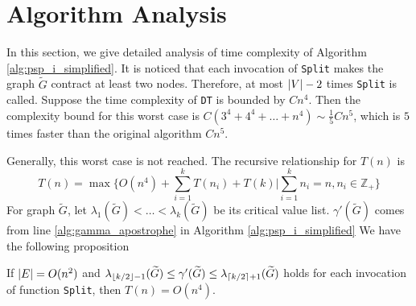 \documentclass[runningheads]{llncs}
\begin{document}
\section{Algorithm Analysis}
In this section, we give detailed analysis of time complexity of Algorithm \ref{alg:psp_i_simplified}.
It is noticed that each invocation of \texttt{Split} makes the graph $\widetilde{G}$ contract at least two nodes. Therefore, at most $\lvert V\rvert-2$ times \texttt{Split} is called. Suppose the time complexity of \texttt{DT} is bounded by $Cn^4$. Then the complexity bound for this worst case is $C(3^4+4^4 + \dots + n^4) \sim \frac{1}{5}Cn^5$, which is $5$ times faster than the original algorithm $Cn^5$.

Generally, this worst case is not reached. The recursive relationship for $T(n)$ is
\begin{equation}\label{eq:Tn}
T(n) = \max \{ O(n^4) + \sum_{i=1}^k T(n_i) + T(k) | \sum_{i=1}^k n_i = n, n_i \in \mathbb{Z}_{+} \}
\end{equation}	
For graph $\widetilde{G}$, let $\lambda_1(\widetilde{G}) < \dots < \lambda_k(\widetilde{G})$ be its critical value list. $\gamma'(\widetilde{G})$ comes from line \ref{alg:gamma_apostrophe} in Algorithm \ref{alg:psp_i_simplified}
We have the following proposition
\begin{proposition}\label{prop:alg_complexity}
	If $\lvert E\rvert = O(n^2)$ and $ \lambda_{\lfloor k/2\rfloor - 1}(\widetilde{G}) \leq \gamma'(\widetilde{G}) \leq \lambda_{\lceil k/2\rceil + 1}(\widetilde{G}) $ holds for each invocation of function \texttt{Split}, then $T(n) = O(n^4)$.
\end{proposition}
\end{document}
